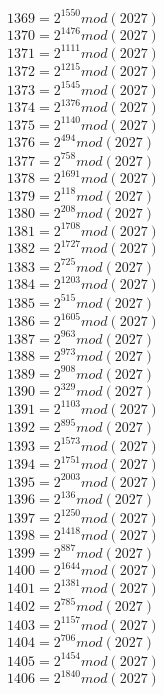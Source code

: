 \documentclass[12pt, letterpaper]{article}
\begin{document}
\begin{itemize}
\begin{multicols}{3}
$1369= 2^{1550} mod (2027)$\\
$1370= 2^{1476} mod (2027)$\\
$1371= 2^{1111} mod (2027)$\\
$1372= 2^{1215} mod (2027)$\\
$1373= 2^{1545} mod (2027)$\\
$1374= 2^{1376} mod (2027)$\\
$1375= 2^{1140} mod (2027)$\\
$1376= 2^{494} mod (2027)$\\
$1377= 2^{758} mod (2027)$\\
$1378= 2^{1691} mod (2027)$\\
$1379= 2^{118} mod (2027)$\\
$1380= 2^{208} mod (2027)$\\
$1381= 2^{1708} mod (2027)$\\
$1382= 2^{1727} mod (2027)$\\
$1383= 2^{725} mod (2027)$\\
$1384= 2^{1203} mod (2027)$\\
$1385= 2^{515} mod (2027)$\\
$1386= 2^{1605} mod (2027)$\\
$1387= 2^{963} mod (2027)$\\
$1388= 2^{973} mod (2027)$\\
$1389= 2^{908} mod (2027)$\\
$1390= 2^{329} mod (2027)$\\
$1391= 2^{1103} mod (2027)$\\
$1392= 2^{895} mod (2027)$\\
$1393= 2^{1573} mod (2027)$\\
$1394= 2^{1751} mod (2027)$\\
$1395= 2^{2003} mod (2027)$\\
$1396= 2^{136} mod (2027)$\\
$1397= 2^{1250} mod (2027)$\\
$1398= 2^{1418} mod (2027)$\\
$1399= 2^{887} mod (2027)$\\
$1400= 2^{1644} mod (2027)$\\
$1401= 2^{1381} mod (2027)$\\
$1402= 2^{785} mod (2027)$\\
$1403= 2^{1157} mod (2027)$\\
$1404= 2^{706} mod (2027)$\\
$1405= 2^{1454} mod (2027)$\\
$1406= 2^{1840} mod (2027)$\\

\end{multicols}
\end{itemize}
\end{document}
